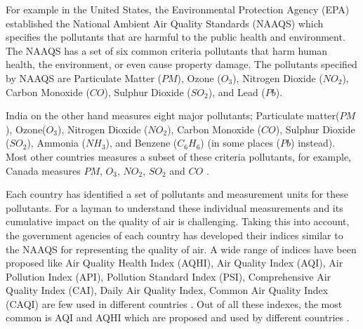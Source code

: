 For example in the United States, the Environmental Protection Agency (EPA) established the National Ambient Air Quality Standards (NAAQS) which specifies the pollutants that are harmful to the public health and environment. The NAAQS has a set of six common criteria pollutants that harm human health, the environment, or even cause property damage. The pollutants specified by NAAQS are Particulate Matter ($PM$), Ozone ($O_3$),  Nitrogen Dioxide ($NO_2$), Carbon Monoxide ($CO$), Sulphur Dioxide ($SO_2$), and Lead ($Pb$).

India on the other hand measures eight major pollutants; Particulate matter($PM$), Ozone($O_3$), Nitrogen Dioxide ($NO_2$), Carbon Monoxide ($CO$), Sulphur Dioxide ($SO_2$), Ammonia ($NH_3$), and Benzene ($C_6H_6$) (in some places ($Pb$) instead). Most other countries measures a subset of these criteria pollutants, for example, Canada measures $PM$, $O_3$, $NO_2$, $SO_2$ and $CO$ \cite{Chen2013}. 


Each country has identified a set of pollutants and measurement units for these pollutants. %
For a layman to understand these individual measurements and its cumulative impact on the quality of air is challenging. 
Taking this into account, the government agencies of each country has developed their indices similar to the NAAQS for representing the quality of air. A wide range of indices have been proposed like Air Quality Health Index (AQHI), Air Quality Index (AQI), Air Pollution Index (API), Pollution Standard Index (PSI), Comprehensive Air Quality Index (CAI), Daily Air Quality Index, Common Air Quality Index (CAQI) are few used in different countries \cite{WinNT}. Out of all these indexes, the most common is AQI and AQHI which are proposed and used by different countries \cite{Chen2013}.

